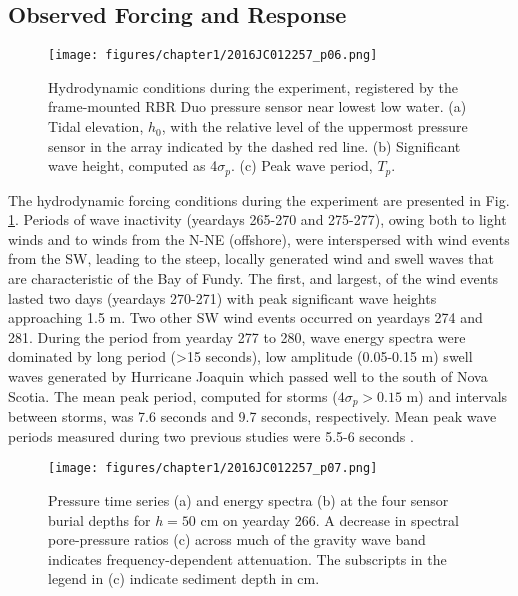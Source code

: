 \subsection{Observed Forcing and Response}\label{subsec:Obs}

\begin{figure} %
		\noindent\texttt{[image: figures/chapter1/2016JC012257\_p06.png]}
	\caption[Wave and tide data from Advocate 2015 experiment]{Hydrodynamic conditions during the experiment, registered by the frame-mounted RBR Duo pressure sensor near lowest low water. (a) Tidal elevation, $h_{0}$, with the relative level of the uppermost pressure sensor in the array indicated by the dashed red line. (b) Significant wave height, computed as 4$\sigma_p$. (c) Peak wave period, $T_{p}$.}
	\label{fig:Wstats}
\end{figure}


The hydrodynamic forcing conditions during the experiment are presented in Fig. \ref{fig:Wstats}. Periods of wave inactivity (yeardays 265-270 and 275-277), owing both to light winds and to winds from the N-NE (offshore), were interspersed with wind events from the SW, leading to the steep, locally generated wind and swell waves that are characteristic of the Bay of Fundy. The first, and largest, of the wind events lasted two days (yeardays 270-271) with peak significant wave heights approaching 1.5 m. Two other SW wind events occurred on yeardays 274 and 281. During the period from yearday 277 to 280, wave energy spectra were dominated by long period (\textgreater 15 seconds), low amplitude (0.05-0.15 m) swell waves generated by Hurricane Joaquin which passed well to the south of Nova Scotia. The mean peak period, computed for storms ($4\sigma_{p} > 0.15 $ m) and intervals between storms, was 7.6 seconds and 9.7 seconds, respectively. Mean peak wave periods measured during two previous studies were 5.5-6 seconds \citep[e.g.,][]{Hay_etal2014}.

\begin{figure} %
		\noindent\texttt{[image: figures/chapter1/2016JC012257\_p07.png]}
	\caption[Pore pressure time series and energy spectra]{Pressure time series (a) and energy spectra (b) at the four sensor burial depths for $h=50$ cm on yearday 266. A decrease in spectral pore-pressure ratios (c) across much of the gravity wave band indicates frequency-dependent attenuation. The subscripts in the legend in (c) indicate sediment depth in cm.}
	\label{fig:ts_Spp}
\end{figure}

